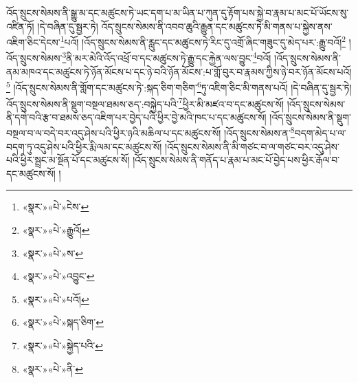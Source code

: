 འོད་སྲུངས་སེམས་ནི་སྒྱུ་མ་དང་མཚུངས་ཏེ་ཡང་དག་པ་མ་ཡིན་པ་ཀུན་དུ་རྟོག་པས་སྐྱེ་བ་རྣམ་པ་མང་པོ་ཡོངས་སུ་འཛིན་ཏོ། །དེ་བཞིན་དུ་སྦྱར་ཏེ། འོད་སྲུངས་སེམས་ནི་འབབ་ཆུའི་རྒྱུན་དང་མཚུངས་ཏེ་མི་གནས་པ་སྐྱེས་ནས་འཇིག་ཅིང་དེངས་\footnote{«སྣར་»«པེ་»ངེས་}པའོ། །འོད་སྲུངས་སེམས་ནི་རླུང་དང་མཚུངས་ཏེ་རིང་དུ་འགྲོ་ཞིང་གཟུང་དུ་མེད་པར་:རྒྱུ་བའོ།\footnote{«སྣར་»«པེ་»རྒྱུའོ།} །འོད་སྲུངས་སེམས་\footnote{«སྣར་»«པེ་»ས་}ནི་མར་མེའི་འོད་འཕྲོ་བ་དང་མཚུངས་ཏེ་རྒྱུ་དང་རྐྱེན་ལས་བྱུང་\footnote{«སྣར་»«པེ་»འབྱུང་}བའོ། །འོད་སྲུངས་སེམས་ནི་ནམ་མཁའ་དང་མཚུངས་ཏེ་ཉོན་མོངས་པ་དང་ཉེ་བའི་ཉོན་མོངས་:པ་གློ་བུར་བ་རྣམས་ཀྱིས་ཉེ་བར་ཉོན་མོངས་པའོ།\footnote{«སྣར་»«པེ་»པའོ།} །འོད་སྲུངས་སེམས་ནི་གློག་དང་མཚུངས་ཏེ་:སྐད་ཅིག་གཅིག་\footnote{«སྣར་»«པེ་»སྐད་ཅིག་}ཏུ་འཇིག་ཅིང་མི་གནས་པའོ། །དེ་བཞིན་དུ་སྦྱར་ཏེ། འོད་སྲུངས་སེམས་ནི་སྡུག་བསྔལ་ཐམས་ཅད་:བསྐྱེད་པའི་\footnote{«སྣར་»«པེ་»སྐྱེད་པའི་}ཕྱིར་མི་མཛའ་བ་དང་མཚུངས་སོ། །འོད་སྲུངས་སེམས་ནི་དགེ་བའི་རྩ་བ་ཐམས་ཅད་འཇིག་པར་བྱེད་པའི་ཕྱིར་བྱེ་མའི་ཁང་པ་དང་མཚུངས་སོ། །འོད་སྲུངས་སེམས་ནི་སྡུག་བསྔལ་བ་ལ་བདེ་བར་འདུ་ཤེས་པའི་ཕྱིར་ཉའི་མཆིལ་པ་དང་མཚུངས་སོ། །འོད་སྲུངས་སེམས་ན་\footnote{«སྣར་»«པེ་»ནི་}བདག་མེད་པ་ལ་བདག་ཏུ་འདུ་ཤེས་པའི་ཕྱིར་རྨི་ལམ་དང་མཚུངས་སོ། །འོད་སྲུངས་སེམས་ནི་མི་གཙང་བ་ལ་གཙང་བར་འདུ་ཤེས་པའི་ཕྱིར་སྦྲང་མ་སྔོན་པོ་དང་མཚུངས་སོ། །འོད་སྲུངས་སེམས་ནི་གནོད་པ་རྣམ་པ་མང་པོ་བྱེད་པས་ཕྱིར་རྒོལ་བ་དང་མཚུངས་སོ། །
